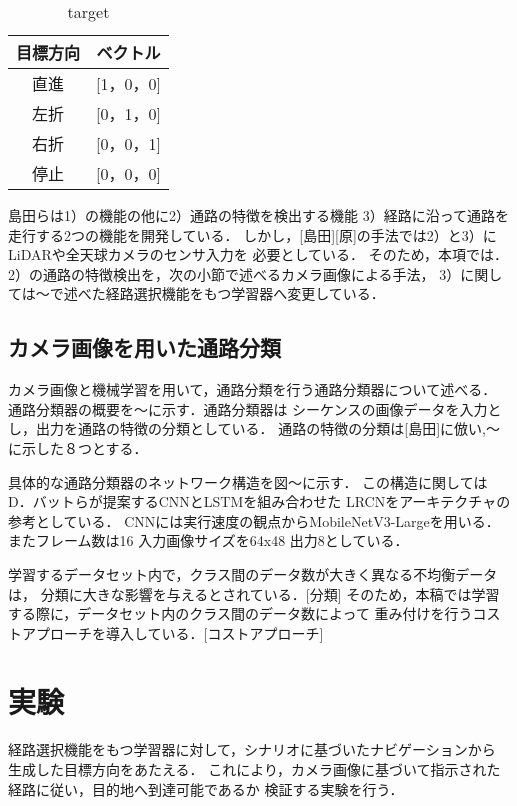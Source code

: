 \documentclass{sice-si}
\begin{document}
\begin{table}[]
    \centering
    \caption{target}
    \begin{tabular}{cc}
    \hline
    目標方向 & ベクトル        \\
    \hline
    直進   & {[}1，0，0{]} \\
    左折   & {[}0，1，0{]} \\
    右折   & {[}0，0，1{]} \\
    停止   & {[}0，0，0{]}\\
    \hline
    \end{tabular}
    \end{table}

\par
島田らは1）の機能の他に2）通路の特徴を検出する機能
3）経路に沿って通路を走行する2つの機能を開発している．
しかし，[島田][原]の手法では2）と3）にLiDARや全天球カメラのセンサ入力を
必要としている．
そのため，本項では．
2）の通路の特徴検出を，次の小節で述べるカメラ画像による手法，
3）に関しては〜で述べた経路選択機能をもつ学習器へ変更している．

\subsection{カメラ画像を用いた通路分類}
カメラ画像と機械学習を用いて，通路分類を行う通路分類器について述べる．
通路分類器の概要を〜に示す．通路分類器は
シーケンスの画像データを入力とし，出力を通路の特徴の分類としている．
通路の特徴の分類は[島田]に倣い,〜に示した８つとする．

\par
具体的な通路分類器のネットワーク構造を図〜に示す．
この構造に関してはD．バットらが提案するCNNとLSTMを組み合わせた
LRCNをアーキテクチャの参考としている．
CNNには実行速度の観点からMobileNetV3-Largeを用いる．
またフレーム数は16 入力画像サイズを64x48 出力8としている．
\par
学習するデータセット内で，クラス間のデータ数が大きく異なる不均衡データは，
分類に大きな影響を与えるとされている．[分類]
そのため，本稿では学習する際に，データセット内のクラス間のデータ数によって
重み付けを行うコストアプローチを導入している．[コストアプローチ]

\section{実験}
経路選択機能をもつ学習器に対して，シナリオに基づいたナビゲーションから
生成した目標方向をあたえる．
これにより，カメラ画像に基づいて指示された経路に従い，目的地へ到達可能であるか
検証する実験を行う．
\end{document}
